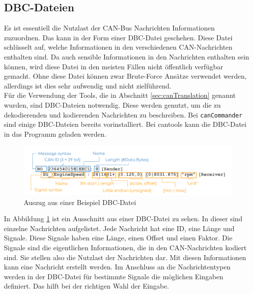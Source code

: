 \subsection{DBC-Dateien}
Es ist essentiell die Nutzlast der CAN-Bus Nachrichten Informationen zuzuordnen. 
Das kann in der Form einer DBC-Datei geschehen\cite{Choi2021}. 
Diese Datei schlüsselt auf, welche Informationen in den verschiedenen CAN-Nachrichten enthalten sind.
Da auch sensible Informationen in den Nachrichten enthalten sein können, wird diese Datei in den meisten 
Fällen nicht öffentlich verfügbar gemacht. Ohne diese Datei können zwar Brute-Force Ansätze verwendet werden,
allerdings ist dies sehr aufwendig und nicht zielführend. \\
Für die Verwendung der Tools, die in Abschnitt \ref{sec:canTranslation} genannt wurden, sind DBC-Dateien notwendig.
Diese werden genutzt, um die zu dekodierenden und kodierenden Nachrichten zu beschreiben. 
Bei \texttt{canCommander}
sind einige DBC-Dateien bereits vorinstalliert. Bei cantools kann die DBC-Datei in das Programm geladen werden.
\begin{figure}[H]
    \centering
    \includegraphics[scale=0.2]{images/CAN-DBC-File-Format-Explained-Intro-Basics_2.png}
    \caption{Auszug aus einer Beispiel DBC-Datei \cite{cssElectronics}}
    \label{fig:dbcfile}
\end{figure}
In Abbildung \ref{fig:dbcfile} ist ein Ausschnitt aus einer DBC-Datei zu sehen.
In dieser sind einzelne Nachrichten aufgelistet. Jede Nachricht hat eine ID, eine Länge und Signale. Diese Signale
haben eine Länge, einen Offset und einen Faktor. Die Signale sind die eigentlichen Informationen, die in den CAN-Nachrichten
kodiert sind. Sie stellen also die Nutzlast der Nachrichten dar. Mit diesen Informationen kann eine Nachricht erstellt werden.
Im Anschluss an die Nachrichtentypen werden in der DBC-Datei für bestimmte Signale die möglichen Eingaben definiert.
Das hilft bei der richtigen Wahl der Eingabe. 